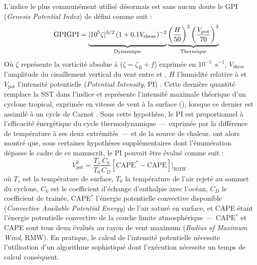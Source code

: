 \documentclass[../main.tex]{subfiles}
\begin{document}
L'indice le plus communément utilisé désormais est sans aucun doute le GPI (\textit{Genesis Potential Index}) de \textcite{emanuel_tropical_2004} défini comme suit :
%
\begin{equation*}
    \tag*{GPI}
    \mathrm{GPI} = \underbrace{\vphantom{\left( \frac{H}{50} \right)^3}\lvert 10^5 \zeta \rvert^{3/2} \, (1 + 0.1 V_{\mathrm{shear}})^{-2}}_{\mathrm{Dynamique}}
    \underbrace{\left( \frac{H}{50} \right)^3 \left( \frac{V_{\mathrm{pot}}}{70} \right)^3}_{\mathrm{Thermique}}
\end{equation*}
%
Où $\zeta$ représente la vorticité absolue à  ($\zeta = \zeta_R + f$) exprimée en 10$^{-5}$~s$^{-1}$, $V_{\mathrm{shear}}$ l'amplitude du cisaillement
vertical du vent entre  et , $H$ l'humidité relative à  et $V_{\mathrm{pot}}$ l'intensité potentielle (\textit{Potential Intensity},
PI) \parencite{emanuel_airsea_1986,emanuel_sensitivity_1995,bister_dissipative_1998,bister_low_2002}. Cette dernière quantité remplace la SST dans l'indice et
représente l'intensité maximale théorique d'un cyclone tropical, exprimée en vitesse de vent à la surface (\ms{}), lorsque ce dernier est assimilé à un cycle de
Carnot \parencite{emanuel_dependence_1987}. Sous cette hypothèse, le PI est proportionnel à l'efficacité énergétique du cycle thermodynamique ---~exprimée par la
différence de température à ses deux extrémités~--- et de la source de chaleur. \textcite{bister_low_2002} ont alors montré que, sous certaines hypothèses
supplémentaires dont l'énumération dépasse le cadre de ce manuscrit, le PI pouvait être évalué comme suit :
%
\begin{equation*}
    \tag*{PI}
    V_{\mathrm{pot}}^2 = \frac{T_s}{T_0} \frac{C_k}{C_D} \left[ \mathrm{CAPE}^* - \mathrm{CAPE} \right] \rvert_{\mathrm{RMW}}
\end{equation*}
%
où $T_s$ est la température de surface, $T_0$ la température de l'air rejeté au sommet du cyclone, $C_k$ est le coefficient d'échange d'enthalpie avec l'océan,
$C_D$ le coefficient de trainée, CAPE$^*$ l'énergie potentielle convective disponible (\textit{Convective Available Potential Energy}) de l'air saturé en
surface, et CAPE étant l'énergie potentielle convective de la couche limite atmosphérique ---~CAPE$^*$ et CAPE sont tous deux évalués au rayon de vent maximum
(\textit{Radius of Maximum Wind}, RMW). En pratique, le calcul de l'intensité potentielle nécessite l'utilisation d'un algorithme sophistiqué dont l'exécution
nécessite un temps de calcul conséquent.
\end{document}
